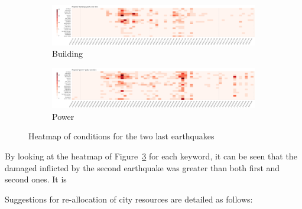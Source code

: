 \begin{figure}[!h]
\begin{subfigure}[!h]{0.96\textwidth}
        \includegraphics[width=1.00\textwidth]{figs/q2/build_2_3_heat.png}
        \caption{Building}
        \label{fig:building_2_3_heat}
    \end{subfigure}
    \begin{subfigure}[!h]{0.96\textwidth}
        \centering
        \includegraphics[width=1.00\textwidth]{figs/q2/power_2_3_heat.png}
        \caption{Power}
        \label{fig:power_2_3_heat}
    \end{subfigure}
    \caption{Heatmap of conditions for the two last earthquakes}
    \label{fig:eq_cond_2_3_heat}
\end{figure}

By looking at the heatmap of Figure~\ref{fig:eq_cond_2_3_heat} for each
keyword, it can be seen that the damaged inflicted by the
second earthquake was greater than both first and second ones. It is 

Suggestions for re-allocation of city resources are detailed as follows:   

